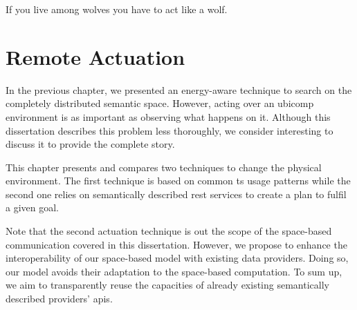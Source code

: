 
\begin{savequote}[50mm]
If you live among wolves you have to act like a wolf.
\end{savequote}


\chapter{Remote Actuation}
\label{cha:actuate}


\newcommand{\restdesc}{\emph{RESTdesc}}



\ifpdf
    \graphicspath{{\pathchapsix/figures/PNG/}{\pathchapsix/figures/PDF/}{\pathchapsix/figures/JPG/}{\pathchapsix/figures/}}
\else
    \graphicspath{{\pathchapsix/figures/EPS/}{\pathchapsix/figures/}}
\fi



In the previous chapter, we presented an energy-aware technique to search on the completely distributed semantic space.
However, acting over an \ac{ubicomp} environment is as important as observing what happens on it.
Although this dissertation describes this problem less thoroughly, we consider interesting to discuss it to provide the complete story. %


This chapter presents and compares two techniques to change the physical environment.
The first technique is based on common \ac{ts} usage patterns while the second one relies on semantically described \ac{rest} services to create a plan to fulfil a given goal.

Note that the second actuation technique is out the scope of the space-based communication covered in this dissertation.
However, we propose to enhance the interoperability of our space-based model with existing data providers.
Doing so, our model avoids their adaptation to the space-based computation. %
To sum up, we aim to transparently reuse the capacities of already existing semantically described providers' \acsp{api}.


